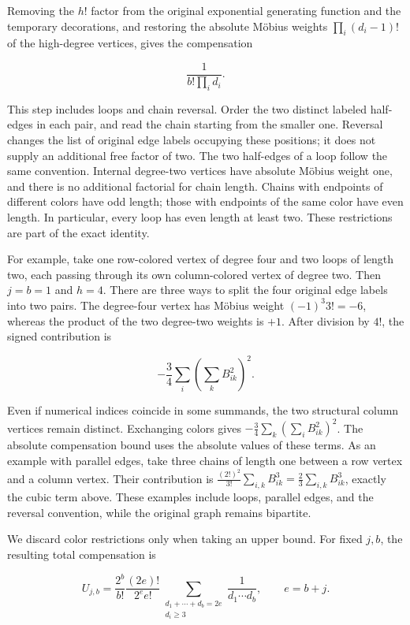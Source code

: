 \documentclass[11pt,a4paper]{article}
\begin{document}
Removing the \(h!\) factor from the original exponential generating function and the temporary decorations, and restoring the absolute Möbius weights \(\prod_i(d_i-1)!\) of the high-degree vertices, gives the compensation

\[
\frac1{b!\prod_i d_i}.
\]

This step includes loops and chain reversal. Order the two distinct labeled half-edges in each pair, and read the chain starting from the smaller one. Reversal changes the list of original edge labels occupying these positions; it does not supply an additional free factor of two. The two half-edges of a loop follow the same convention. Internal degree-two vertices have absolute Möbius weight one, and there is no additional factorial for chain length. Chains with endpoints of different colors have odd length; those with endpoints of the same color have even length. In particular, every loop has even length at least two. These restrictions are part of the exact identity.

For example, take one row-colored vertex of degree four and two loops of length two, each passing through its own column-colored vertex of degree two. Then \(j=b=1\) and \(h=4\). There are three ways to split the four original edge labels into two pairs. The degree-four vertex has Möbius weight \((-1)^3 3!=-6\), whereas the product of the two degree-two weights is \(+1\). After division by \(4!\), the signed contribution is

\[
-\frac34\sum_i\left(\sum_k B_{ik}^2\right)^2.
\]

Even if numerical indices coincide in some summands, the two structural column vertices remain distinct. Exchanging colors gives \(-\tfrac34\sum_k(\sum_i B_{ik}^2)^2\). The absolute compensation bound uses the absolute values of these terms. As an example with parallel edges, take three chains of length one between a row vertex and a column vertex. Their contribution is \(\tfrac{(2!)^2}{3!}\sum_{i,k}B_{ik}^3=\tfrac23\sum_{i,k}B_{ik}^3\), exactly the cubic term above. These examples include loops, parallel edges, and the reversal convention, while the original graph remains bipartite.

We discard color restrictions only when taking an upper bound. For fixed \(j,b\), the resulting total compensation is

\[
U_{j,b}=
\frac{2^b}{b!}\frac{(2e)!}{2^e e!}
\sum_{\substack{d_1+\cdots+d_b=2e\\d_i\ge3}}
\frac1{d_1\cdots d_b},
\qquad e=b+j.
\]
\end{document}
